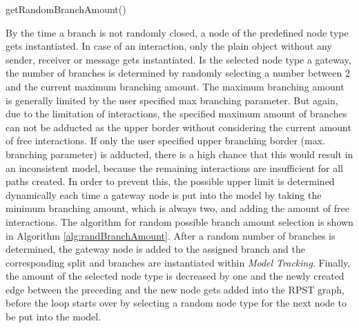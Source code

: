 \begin{algorithm}[H]
\small
\DontPrintSemicolon
\SetAlgoLined
{}
\caption{getRandomBranchAmount()}
\label{alg:randBranchAmount}
\end{algorithm}
\vspace{0.5cm}
By the time a branch is not randomly closed, a node of the predefined node type gets instantiated. In case of an interaction, only the plain object without any sender, receiver or message gets instantiated. Is the selected node type a gateway, the number of branches is determined by randomly selecting a number between 2 and the current maximum branching amount. The maximum branching amount is generally limited by the user specified max branching parameter. But again, due to the limitation of interactions, the specified maximum amount of branches can not be adducted as the upper border without considering the current amount of free interactions. If only the user specified upper branching border (max. branching parameter) is adducted, there is a high chance that this would result in an inconsistent model, because the remaining interactions are insufficient for all paths created. In order to prevent this, the possible upper limit is determined dynamically each time a gateway node is put into the model by taking the minimum branching amount, which is always two, and adding the amount of free interactions. The algorithm for random possible branch amount selection is shown in Algorithm \ref{alg:randBranchAmount}. After a random number of branches is determined, the gateway node is added to the assigned branch and the corresponding split and branches are instantiated within \textit{Model Tracking}. Finally, the amount of the selected node type is decreased by one and the newly created edge between the preceding and the new node gets added into the RPST graph, before the loop starts over by selecting a random node type for the next node to be put into the model.\\

